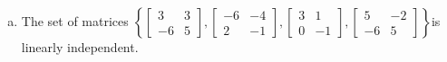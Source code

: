\begin{exerciseAnswer}
\begin{enumerate}[(a)]
\item The set of matrices \( \left\{ \left[\begin{array}{cc}
3 & 3 \\
-6 & 5
\end{array}\right] , \left[\begin{array}{cc}
-6 & -4 \\
2 & -1
\end{array}\right] , \left[\begin{array}{cc}
3 & 1 \\
0 & -1
\end{array}\right] , \left[\begin{array}{cc}
5 & -2 \\
-6 & 5
\end{array}\right] \right\} \)is linearly independent.
\end{enumerate}
    
\end{exerciseAnswer}
    
